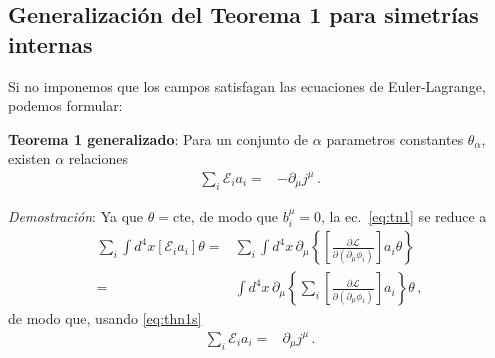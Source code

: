 




\subsection{Generalización del Teorema 1 para simetrías internas}
\begin{frame}
Si no imponemos que los campos satisfagan las ecuaciones de Euler-Lagrange, podemos formular:

\textbf{Teorema 1 generalizado}: Para un conjunto de $\alpha$ parametros constantes $\theta_{\alpha}$, existen $\alpha$ relaciones
\begin{align}
     \sum_i \mathcal{E}_ia_i     
 =&-  \partial_{\mu} j^{\mu}\,.
\end{align}

\emph{Demostración}:  Ya que $\theta=\text{cte}$, de modo que $b_i^{\mu}=0$, la ec.~\eqref{eq:tn1} se reduce a
\begin{align*}
  \sum_i\int {d^4}x \left[ \mathcal{E}_ia_i  \right]  \theta    =&  \sum_i \int {d^4}x\, \partial_{\mu} \left\{ \left[ \frac{\partial\mathcal{L}}{\partial(\partial_{\mu}\phi_i)}\right] a_i \theta   \right\} \nonumber\\
 =&   \int {d^4}x\, \partial_{\mu} \left\{ \sum_i\left[ \frac{\partial\mathcal{L}}{\partial(\partial_{\mu}\phi_i)}\right] a_i    \right\}\theta\,,
\end{align*}
de modo que, usando \eqref{eq:thn1s}
\begin{align}
  \label{eq:th1ng}
    \sum_i \mathcal{E}_ia_i     
 =&  \partial_{\mu} j^{\mu}\,.
\end{align}
\end{frame}

